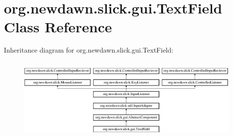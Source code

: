 \hypertarget{classorg_1_1newdawn_1_1slick_1_1gui_1_1_text_field}{}\section{org.\+newdawn.\+slick.\+gui.\+Text\+Field Class Reference}
\label{classorg_1_1newdawn_1_1slick_1_1gui_1_1_text_field}
Inheritance diagram for org.\+newdawn.\+slick.\+gui.\+Text\+Field\+:\begin{figure}[H]
\begin{center}
\leavevmode
\includegraphics[height=4.226415cm]{classorg_1_1newdawn_1_1slick_1_1gui_1_1_text_field}
\end{center}
\end{figure}
